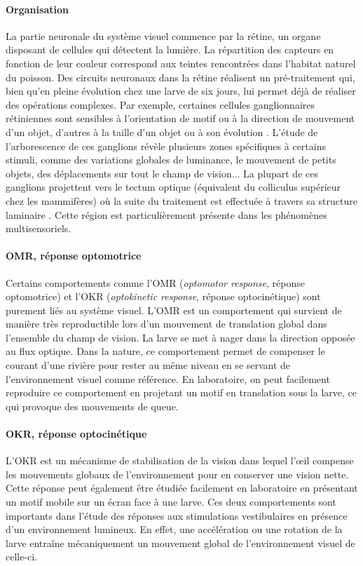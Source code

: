 \paragraph{Organisation}
La partie neuronale du système visuel commence par la rétine, un organe disposant de cellules qui détectent la lumière. La répartition des capteurs en fonction de leur couleur correspond aux teintes rencontrées dans l'habitat naturel du poisson. Des circuits neuronaux dans la rétine réalisent un pré-traitement qui, bien qu'en pleine évolution chez une larve de six jours, lui permet déjà de réaliser des opérations complexes. Par exemple, certaines cellules ganglionnaires rétiniennes sont sensibles à l'orientation de motif ou à la direction de mouvement d'un objet, d'autres à la taille d'un objet ou à son évolution \cite{bollmann_zebrafish_2019}. L'étude de l'arborescence de ces ganglions révèle plusieurs zones spécifiques à certains stimuli, comme des variations globales de luminance, le mouvement de petits objets, des déplacements sur tout le champ de vision... La plupart de ces ganglions projettent vers le tectum optique (équivalent du colliculus supérieur chez les mammifères) où la suite du traitement est effectuée à travers sa structure laminaire \cite{portugues_neural_2009}. Cette région est particulièrement présente dans les phénomènes multisensoriels. %

\paragraph{OMR, réponse optomotrice}
Certains comportements comme l'OMR (\emph{optomotor response}, réponse optomotrice) et l'OKR (\emph{optokinetic response}, réponse optocinétique) sont purement liés au système visuel. L'OMR est un comportement qui survient de manière très reproductible lors d'un mouvement de translation global dans l'ensemble du champ de vision. La larve se met à nager dans la direction opposée au flux optique. Dans la nature, ce comportement permet de compenser le courant d'une rivière pour rester au même niveau en se servant de l'environnement visuel comme référence. En laboratoire, on peut facilement reproduire ce comportement en projetant un motif en translation sous la larve, ce qui provoque des mouvements de queue.

\paragraph{OKR, réponse optocinétique}
L'OKR est un mécanisme de stabilisation de la vision dans lequel l’œil compense les mouvements globaux de l'environnement pour en conserver une vision nette. Cette réponse peut également être étudiée facilement en laboratoire en présentant un motif mobile sur un écran face à une larve. Ces deux comportements sont importants dans l'étude des réponses aux stimulations vestibulaires en présence d'un environnement lumineux. En effet, une accélération ou une rotation de la larve entraîne mécaniquement un mouvement global de l'environnement visuel de celle-ci.

